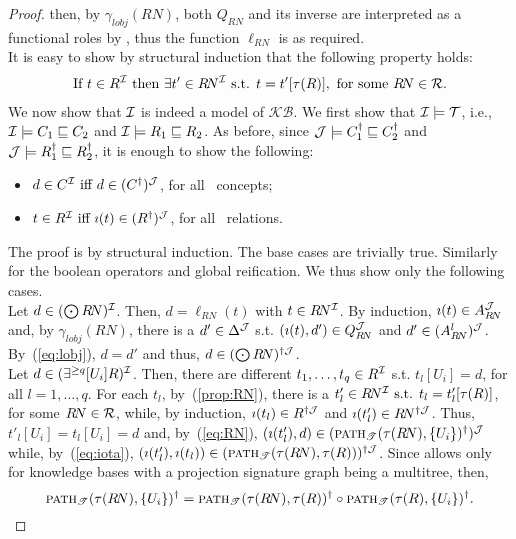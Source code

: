 \documentclass[envcountsame,draft]{llncs}
\newcommand{\lreif}[1]{\ensuremath{\bigodot#1}}
\newcommand{\Int}[1]{#1^{\Imc}\xspace}
\newcommand{\KB}{\ensuremath{\mathcal{KB}}\xspace}
\newcommand{\pth}[2]{\ensuremath{\textsc{path}_{\mathscr{T}}(#1,#2)}\xspace}
\begin{document}
\begin{proof}
%
then, by $\gamma_{\textit{lobj}}(R\!N)$, both $Q_{R\!N}$ and its inverse are
interpreted as a functional roles by \Jmc, thus
the function $\ell_{R\!N}$ is as required.\\
%
It is easy to show by structural induction that the following property holds:
\begin{align}\label{prop:RN}
\text{If } t\in R^\mathcal{I} \text{ then } \exists t'\in R\!N^\mathcal{I} \text{
  s.t. } 
t=t'[\tau(R)], \text{ for some } R\!N\in\mathcal R.
\end{align}
%
We now show that $\mathcal{I}$ is indeed a model of $\KB$. We first show that
$\mathcal{I}\models \mathcal{T}$, i.e., 
$\mathcal{I}\models {C_1\sqsubseteq C_2}$ and
$\mathcal{I}\models R_1\sqsubseteq R_2$. As before, since
$\mathcal{J}\models {C_1^\dag\sqsubseteq C_2^\dag}$ and
$\mathcal{J}\models R_1^\dag\sqsubseteq R_2^\dag$, it is enough to show the
following:
  \begin{itemize}
  \item $d\in \Int{C} \text{ iff } d\in (C^\dag)^\Jmc$, for all \DLRpm\ concepts;
  \item $t\in \Int{R} \text{ iff } \imath(t)\in (R^\dag)^\Jmc$, for all \DLRpm\ relations.
  \end{itemize}
%
  The proof is by structural induction. The base cases are trivially
  true. Similarly for the boolean operators and global
  reification. We thus show only the following cases.\\
%
  Let $d\in(\lreif R\!N)^\Imc$. Then, $d=\ell_{R\!N}(t)$ with
  $t\in R\!N^\mathcal{I}$. By induction, $\imath(t)\in A_{R\!N}^\mathcal{J}$ and, by
  $\gamma_{\textit{lobj}}({R\!N})$, there is a $d'\in\Delta^\mathcal{J}$
  s.t. $(\imath(t),d')\in Q_{R\!N}^\mathcal{J}$ and
  $d'\in (A_{R\!N}^l)^\mathcal{J}$.  By~(\ref{eq:lobj}), $d=d'$ and
  thus, $d\in (\lreif R\!N)^{\dag\Jmc}$.
  \\
%
  Let $d\in(\exists^{\geq q}[{U_i}] R)^{\mathcal{I}}$. Then, there are
  different $t_1,\ldots,t_q\in R^\mathcal{I}$ s.t. $t_l[U_i]=d$, for all
  $l=1,\ldots,q$. For each $t_l$, by~(\ref{prop:RN}), there is a
  $t'_l\in R\!N^\mathcal{I} \text{ s.t. } t_l=t'_l[\tau(R)]$, for some
  $R\!N\in\mathcal R$, while, by induction, $\imath(t_l)\in R^{\dag \mathcal{J}}$ and
  $\imath(t'_l)\in R\!N^{\dag\mathcal{J}}$. Thus, $t'_l[U_i]=t_l[U_i]=d$ and,
  by~(\ref{eq:RN}),
  $(\imath(t'_l),d)\in (\pth{\tau(R\!N)}{\{U_i\}}^\dag)^\Jmc$ while,
  by~(\ref{eq:iota}),
  $(\imath(t'_l),\imath(t_l))\in
  (\pth{\tau(R\!N)}{\tau(R)})^{\dag\Jmc}$.
  Since \DLRpm allows only for knowledge bases with a projection
  signature graph being a multitree, then,
  $$\pth{\tau(R\!N)}{\{U_i\}}^\dag =
  \pth{\tau(R\!N)}{\tau(R)}^\dag\chain \pth{\tau(R)}{\{U_i\}}^\dag.$$

\end{proof}
\end{document}
